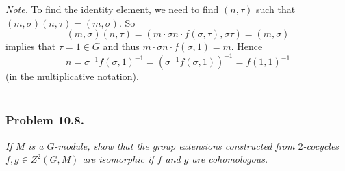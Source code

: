 \documentclass{article}
\begin{document}
\emph{Note.}
  To find the identity element, we need to find $(n,\tau)$
  such that $(m,\sigma)(n,\tau) = (m,\sigma)$.
  So
  \[
    (m,\sigma)(n,\tau) = (m \cdot \sigma n \cdot f(\sigma,\tau), \sigma\tau) = (m,\sigma)
  \]
  implies that $\tau = 1 \in G$ and thus $m \cdot \sigma n \cdot f(\sigma,1) = m$.
  Hence
  \[
    n
    = \sigma^{-1} f(\sigma,1)^{-1}
    = (\sigma^{-1} f(\sigma,1))^{-1}
    = f(1,1)^{-1}
  \]
  (in the multiplicative notation). \\\\






\subsubsection*{Problem 10.8.}
\emph{If $M$ is a $G$-module,
show that the group extensions constructed from $2$-cocycles
$f, g \in Z^2(G,M)$ are isomorphic if $f$ and $g$ are cohomologous.} \\
\end{document}
